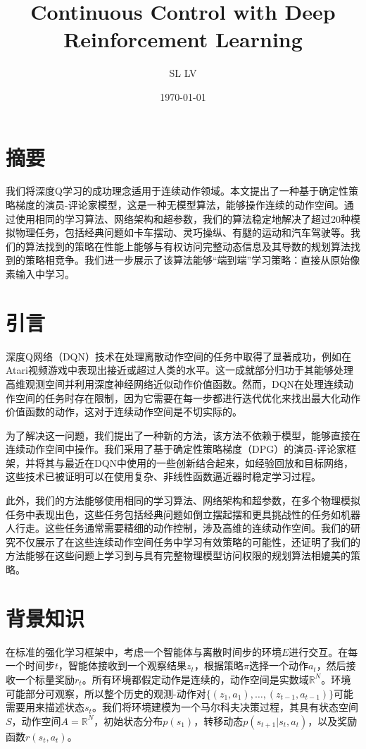\documentclass[twocolumn, 10pt]{article} %
\theoremstyle{remark}
\begin{document}
\title{Continuous Control with Deep Reinforcement Learning}
\author{SL LV}
\date{\today}
\maketitle

\section{摘要}

我们将深度Q学习的成功理念适用于连续动作领域。本文提出了一种基于确定性策略梯度的演员-评论家模型，这是一种无模型算法，能够操作连续的动作空间。通过使用相同的学习算法、网络架构和超参数，我们的算法稳定地解决了超过20种模拟物理任务，包括经典问题如卡车摆动、灵巧操纵、有腿的运动和汽车驾驶等。我们的算法找到的策略在性能上能够与有权访问完整动态信息及其导数的规划算法找到的策略相竞争。我们进一步展示了该算法能够“端到端”学习策略：直接从原始像素输入中学习。

\section{引言}

深度Q网络（DQN）技术在处理离散动作空间的任务中取得了显著成功，例如在Atari视频游戏中表现出接近或超过人类的水平。这一成就部分归功于其能够处理高维观测空间并利用深度神经网络近似动作价值函数。然而，DQN在处理连续动作空间的任务时存在限制，因为它需要在每一步都进行迭代优化来找出最大化动作价值函数的动作，这对于连续动作空间是不切实际的。

为了解决这一问题，我们提出了一种新的方法，该方法不依赖于模型，能够直接在连续动作空间中操作。我们采用了基于确定性策略梯度（DPG）的演员-评论家框架，并将其与最近在DQN中使用的一些创新结合起来，如经验回放和目标网络，这些技术已被证明可以在使用复杂、非线性函数逼近器时稳定学习过程。

此外，我们的方法能够使用相同的学习算法、网络架构和超参数，在多个物理模拟任务中表现出色，这些任务包括经典问题如倒立摆起摆和更具挑战性的任务如机器人行走。这些任务通常需要精细的动作控制，涉及高维的连续动作空间。我们的研究不仅展示了在这些连续动作空间任务中学习有效策略的可能性，还证明了我们的方法能够在这些问题上学习到与具有完整物理模型访问权限的规划算法相媲美的策略。


\section{背景知识}

在标准的强化学习框架中，考虑一个智能体与离散时间步的环境$E$进行交互。在每一个时间步$t$，智能体接收到一个观察结果$z_t$，根据策略$\pi$选择一个动作$a_t$，然后接收一个标量奖励$r_t$。所有环境都假定动作是连续的，动作空间是实数域$\mathbb{R}^N$。环境可能部分可观察，所以整个历史的观测-动作对$\{(z_1, a_1), \ldots, (z_{t-1}, a_{t-1})\}$可能需要用来描述状态$s_t$。我们将环境建模为一个马尔科夫决策过程，其具有状态空间$S$，动作空间$A = \mathbb{R}^N$，初始状态分布$p(s_1)$，转移动态$p(s_{t+1} | s_t, a_t)$，以及奖励函数$r(s_t, a_t)$。
\end{document}
